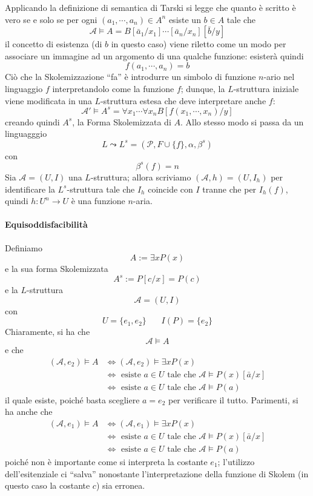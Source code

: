 Applicando la definizione di semantica di Tarski si legge che quanto è 
scritto è vero se e solo se per ogni $(a_1, \cdots, a_n) \in A^n$ esiste 
un $b \in A$ tale che 
$$
\mathcal{A} \models A = B[\bar{a}_1/x_1]\cdots[\bar{a}_n/x_n][\bar{b}/y]
$$
il concetto di esistenza (di $b$ in questo caso) viene riletto come un modo 
per associare un immagine ad un argomento di una qualche funzione: esisterà quindi
$$
f(a_1, \cdots, a_n) = b
$$
Ciò che la Skolemizzazione ``fa'' è introdurre un simbolo di funzione $n$-ario 
nel linguaggio $f$ interpretandolo come la funzione $f$; dunque, 
la $L$-struttura iniziale viene modificata in una $L$-struttura estesa 
che deve interpretare anche $f$: 
$$
\mathcal{A}' \models A^s = \forall x_1 \cdots \forall x_n B[f(x_1, \cdots, x_n)/y]
$$
creando quindi $A^s$, la Forma Skolemizzata di $A$. 
Allo stesso modo si passa da un linguagggio 
$$
L \leadsto L^s = (\mathcal{P}, F \cup \{f\}, \alpha, \beta^s)
$$
con 
$$
\beta^s(f) = n
$$
Sia $\mathcal{A} = (U,I)$ una $L$-struttura; allora scriviamo $(\mathcal{A}, h)=(U, I_h)$ per 
identificare la $L^s$-struttura tale che $I_h$ coincide con $I$ tranne 
che per $I_h(f)$, quindi $h: U^n \rightarrow U$ è una funzione $n$-aria.

\paragraph{Equisoddisfacibilità}
Definiamo 
$$
A := \exists x P(x)
$$
e la sua forma Skolemizzata 
$$
A^s := P[c/x] = P(c)
$$
e la $L$-struttura 
$$
\mathcal{A} = (U, I)
$$
con 
$$
U=\{e_1,e_2\} ~~~~~~~~ I(P) = \{e_2\} 
$$
Chiaramente, si ha che 
$$
\mathcal{A} \models A
$$
e che 
\begin{align*}
        (\mathcal{A}, e_2) \models A &\iff (\mathcal{A}, e_2) \models \exists x P(x)\\
                                     &\iff \text{ esiste } a \in U \text{ tale che } 
                                             \mathcal{A} \models P(x)[\bar{a}/x] \\
                                     &\iff \text{ esiste } a \in U \text{ tale che } \mathcal{A} \models P(a)
\end{align*}
il quale esiste, poiché basta scegliere $a = e_2$ per verificare il tutto. 
Parimenti, si ha anche che 
\begin{align*}
        (\mathcal{A}, e_1) \models A &\iff (\mathcal{A}, e_1) \models \exists x P(x)\\
                                     &\iff \text{ esiste } a \in U \text{ tale che } 
                                             \mathcal{A} \models P(x)[\bar{a}/x] \\
                                     &\iff \text{ esiste } a \in U \text{ tale che } \mathcal{A} \models P(a)
\end{align*}
poiché non è importante come si interpreta la costante $e_1$; l'utilizzo dell'esitenziale 
ci ``salva'' nonostante l'interpretazione della funzione di Skolem (in questo 
caso la costante $c$) sia erronea.

